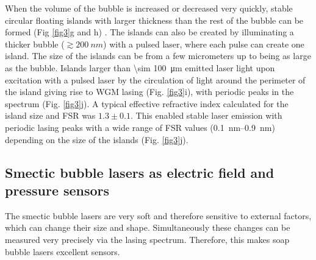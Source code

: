 \documentclass[a4paper,12pt]{article}
\begin{document}
	
	When the volume of the bubble is increased or decreased very quickly, stable circular floating islands with larger thickness than the rest of the bubble can be formed (Fig \ref{fig3}g and h) \cite{clark2017realization,stannarius1998self}. The islands can also be created by illuminating a thicker bubble ($\gtrsim \SI{200}{nm}$) with a pulsed laser, where each pulse can create one island. The size of the islands can be from a few micrometers up to being as large as the bubble. Islands larger than \SI{\sim 100}{\micro m} emitted laser light upon excitation with a pulsed laser by the circulation of light around the perimeter of the island giving rise to WGM lasing (Fig. \ref{fig3}i), with periodic peaks in the spectrum (Fig. \ref{fig3}j). A typical effective refractive index calculated for the island size and FSR was $1.3 \pm 0.1$. This enabled stable laser emission with periodic lasing peaks with a wide range of FSR values (\SIrange{0.1}{0.9}{nm}) depending on the size of the islands (Fig. \ref{fig3}j).
	
	
	
	\subsection*{Smectic bubble lasers as electric field and pressure sensors}
	
	The smectic bubble lasers are very soft and therefore sensitive to external factors, which can change their size and shape. Simultaneously these changes can be measured very precisely via the lasing spectrum. Therefore, this makes soap bubble lasers excellent sensors.
	
\end{document}
